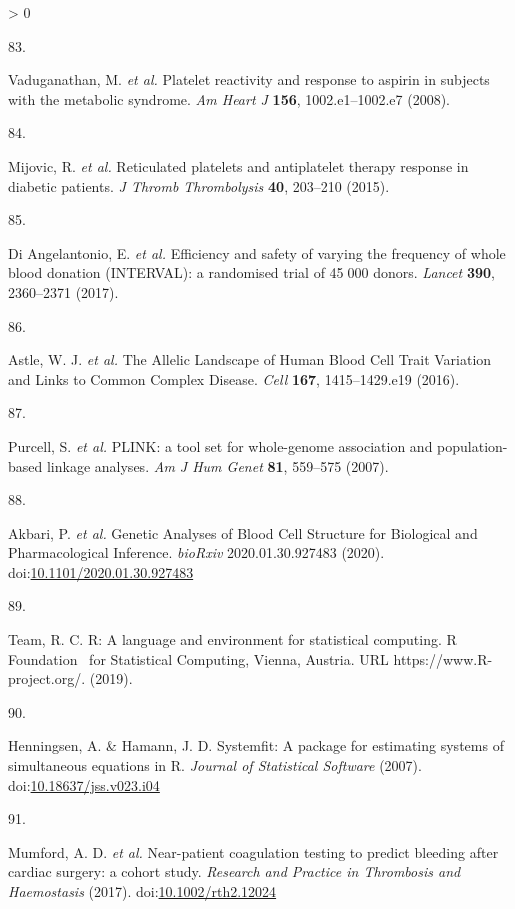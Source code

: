 \documentclass[11pt,twoside]{bristolthesis}
\newlength{\cslhangindent}
\newlength{\csllabelwidth}
\newenvironment{CSLReferences}[2] %
 {%
  \setlength{\parindent}{0pt}
  \ifodd #1 \everypar{\setlength{\hangindent}{\cslhangindent}}\ignorespaces\fi
  \ifnum #2 > 0
  \setlength{\parskip}{#2\baselineskip}
  \fi
 }%
 {}
\newcommand{\CSLLeftMargin}[1]{\parbox[t]{\csllabelwidth}{#1}}
\newcommand{\CSLRightInline}[1]{\parbox[t]{\linewidth - \csllabelwidth}{#1}\break}
\begin{document}
\begin{CSLReferences}{0}{0}
\leavevmode\hypertarget{ref-Vaduganathan2008a}{}%
\CSLLeftMargin{83. }
\CSLRightInline{Vaduganathan, M. \emph{et al.} {Platelet reactivity and response to aspirin in subjects with the metabolic syndrome}. \emph{Am Heart J} \textbf{156}, 1002.e1--1002.e7 (2008).}

\leavevmode\hypertarget{ref-Mijovic2015a}{}%
\CSLLeftMargin{84. }
\CSLRightInline{Mijovic, R. \emph{et al.} {Reticulated platelets and antiplatelet therapy response in diabetic patients}. \emph{J Thromb Thrombolysis} \textbf{40}, 203--210 (2015).}

\leavevmode\hypertarget{ref-DiAngelantonio2017}{}%
\CSLLeftMargin{85. }
\CSLRightInline{Di Angelantonio, E. \emph{et al.} {Efficiency and safety of varying the frequency of whole blood donation (INTERVAL): a randomised trial of 45 000 donors}. \emph{Lancet} \textbf{390}, 2360--2371 (2017).}

\leavevmode\hypertarget{ref-Astle2016}{}%
\CSLLeftMargin{86. }
\CSLRightInline{Astle, W. J. \emph{et al.} {The Allelic Landscape of Human Blood Cell Trait Variation and Links to Common Complex Disease}. \emph{Cell} \textbf{167}, 1415--1429.e19 (2016).}

\leavevmode\hypertarget{ref-Purcell2007a}{}%
\CSLLeftMargin{87. }
\CSLRightInline{Purcell, S. \emph{et al.} {PLINK: a tool set for whole-genome association and population-based linkage analyses}. \emph{Am J Hum Genet} \textbf{81}, 559--575 (2007).}

\leavevmode\hypertarget{ref-Akbari2020}{}%
\CSLLeftMargin{88. }
\CSLRightInline{Akbari, P. \emph{et al.} {Genetic Analyses of Blood Cell Structure for Biological and Pharmacological Inference}. \emph{bioRxiv} 2020.01.30.927483 (2020). doi:\href{https://doi.org/10.1101/2020.01.30.927483}{10.1101/2020.01.30.927483}}

\leavevmode\hypertarget{ref-Team2019a}{}%
\CSLLeftMargin{89. }
\CSLRightInline{Team, R. C. {R: A language and environment for statistical computing. R Foundation~ for Statistical Computing, Vienna, Austria. URL https://www.R-project.org/.} (2019).}

\leavevmode\hypertarget{ref-Henningsen2007}{}%
\CSLLeftMargin{90. }
\CSLRightInline{Henningsen, A. \& Hamann, J. D. {Systemfit: A package for estimating systems of simultaneous equations in R}. \emph{Journal of Statistical Software} (2007). doi:\href{https://doi.org/10.18637/jss.v023.i04}{10.18637/jss.v023.i04}}

\leavevmode\hypertarget{ref-Mumford2017}{}%
\CSLLeftMargin{91. }
\CSLRightInline{Mumford, A. D. \emph{et al.} {Near-patient coagulation testing to predict bleeding after cardiac surgery: a cohort study}. \emph{Research and Practice in Thrombosis and Haemostasis} (2017). doi:\href{https://doi.org/10.1002/rth2.12024}{10.1002/rth2.12024}}


\end{CSLReferences}
\end{document}
